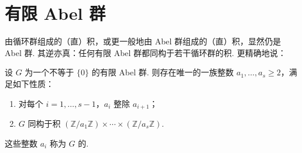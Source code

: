 \section{有限 Abel 群}\label{sec:fg-1-3}
由循环群组成的（直）积，或更一般地由 Abel 群组成的（直）积，显然仍是 Abel 群. 其逆亦真：任何有限 Abel 群都同构于若干循环群的积. 更精确地说：
\begin{theorem}\label{thm:fg-1-3-1}
设 $G$ 为一个不等于 $\{0\}$ 的有限 Abel 群. 则存在唯一的一族整数 $a_1,\dots,a_s\geqslant2$，满足如下性质：
\begin{enumerate}[label=\roman*)]
\item 对每个 $i=1,\dots,s-1$，$a_i$ 整除 $a_{i+1}$；
\item $G$ 同构于积 $(\mathbb{Z}/a_1\mathbb{Z})\times\cdots\times(\mathbb{Z}/a_s\mathbb{Z})$.
\end{enumerate}
这些整数 $a_i$ 称为 $G$ 的.
\end{theorem}
